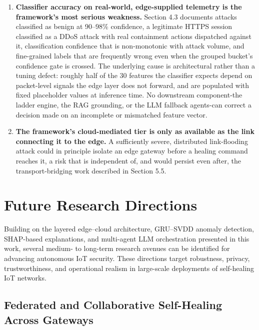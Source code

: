 \begin{enumerate}
\item \textbf{Classifier accuracy on real-world, edge-supplied telemetry is the framework's most serious weakness.} Section 4.3 documents attacks classified as benign at 90--98\% confidence, a legitimate HTTPS session classified as a DDoS attack with real containment actions dispatched against it, classification confidence that is non-monotonic with attack volume, and fine-grained labels that are frequently wrong even when the grouped bucket's confidence gate is crossed. The underlying cause is architectural rather than a tuning defect: roughly half of the 30 features the classifier expects depend on packet-level signals the edge layer does not forward, and are populated with fixed placeholder values at inference time. No downstream component-the ladder engine, the RAG grounding, or the LLM fallback agents-can correct a decision made on an incomplete or mismatched feature vector.



\item \textbf{The framework's cloud-mediated tier is only as available as the link connecting it to the edge.} A sufficiently severe, distributed link-flooding attack could in principle isolate an edge gateway before a healing command reaches it, a risk that is independent of, and would persist even after, the transport-bridging work described in Section 5.5.





\end{enumerate}

\section{Future Research Directions}

Building on the layered edge--cloud architecture, GRU--SVDD anomaly detection, SHAP-based explanations, and multi-agent LLM orchestration presented in this work, several medium- to long-term research avenues can be identified for advancing autonomous IoT security. These directions target robustness, privacy, trustworthiness, and operational realism in large-scale deployments of self-healing IoT networks.

\subsection{Federated and Collaborative Self-Healing Across Gateways}

